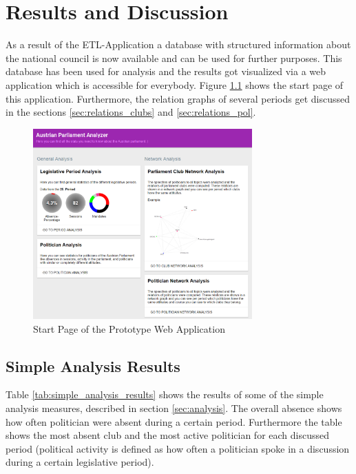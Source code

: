 

\chapter{Results and Discussion}
\label{chap:evaluation}

As a result of the ETL-Application a database with structured information about the national council is now available and can be used for further purposes. This database has been used for analysis and the results got visualized via a web application which is accessible for everybody. Figure \ref{fig:start_page_prototype} shows the start page of this application. Furthermore, the relation graphs of several periods get discussed in the sections \ref{sec:relations_clubs} and \ref{sec:relations_pol}. 

\begin{figure}
	\center
	\includegraphics[width=0.75\textwidth]{imgs/result_start_page}
	\caption{Start Page of the Prototype Web Application}
	\label{fig:start_page_prototype}
\end{figure}

\section{Simple Analysis Results}
Table \ref{tab:simple_analysis_results} shows the results of some of the simple analysis measures, described in section \ref{sec:analysis}. The overall absence shows how often politician were absent during a certain period. Furthermore the table shows the most absent club and the most active politician for each discussed period (political activity is defined as how often a politician spoke in a discussion during a certain legislative period).

